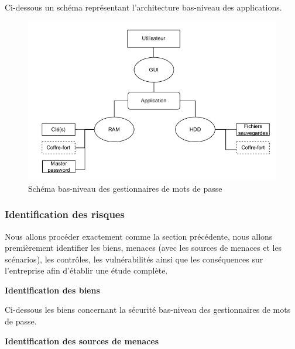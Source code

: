 Ci-dessous un schéma représentant l'architecture bas-niveau des applications.

\begin{figure}[H]
	\includegraphics[width=14.5cm]{images/dfd_low.png}
	\centering
	\caption{Schéma bas-niveau des gestionnaires de mots de passe}
\end{figure}

\subsubsection{Identification des risques}

Nous allons procéder exactement comme la section précédente, nous allons premièrement identifier les biens, menaces (avec les sources de menaces et les scénarios), les contrôles, les vulnérabilités ainsi que les conséquences sur l'entreprise afin d'établir une étude complète.

\textbf{Identification des biens}

Ci-dessous les biens concernant la sécurité bas-niveau des gestionnaires de mots de passe.

\begin{table}[H]
	\centering
	\caption{Biens des gestionnaires de mots de passe M5}
\end{table}
\textbf{Identification des sources de menaces}

